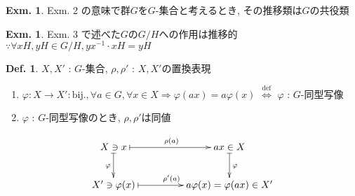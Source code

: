 \documentclass[uplatex,dvipdfmx,9pt]{beamer}
\newcommand{\defarrow}{\overset{\mathrm{def}}{\Leftrightarrow}}
\newcommand{\inverse}[1]{#1^{-1}}
\newcounter{textExmCount}
\theoremstyle{definition} %
\newtheorem{defn}{Def.}[subsection] %
\theoremstyle{example}
\newtheorem{exmText}[textExmCount]{Exm.}
\begin{document}
      \begin{frame}

        \begin{exmText}
          Exm. 2 の意味で群$G$を$G$-集合と考えるとき, その推移類は$G$の共役類
        \end{exmText}

        \begin{exmText}
          Exm. 3 で述べた$G$の$G/H$への作用は推移的 \\
          $\because \forall xH, yH \in G/H, y \inverse{x} \cdot xH = yH$
        \end{exmText}
        
      \end{frame}

      \begin{frame}

        \begin{defn}
          $X, X'$ : $G$-集合, $\rho, \rho'$ : $X, X'$の置換表現 \\
          \begin{enumerate}
            \item $\varphi \colon X \to X': \text{bij.}, \forall a \in G, \forall x \in X \Rightarrow \varphi(ax) = a\varphi(x)$ $\defarrow$ $\varphi$ : \alert{$G$-同型写像} 
            \item $\varphi$ : $G$-同型写像のとき, $\rho, \rho'$は\alert{同値}
          \end{enumerate}
        \end{defn}

        \[
          \xymatrix@!C{
            {X \ni x} \ar@{|->}[d]_{\varphi} \ar@{|->}[r]^{\rho(a)} & {ax \in X} \ar@{|->}[d]^{\varphi} \\
            {X' \ni \varphi(x)} \ar@{|->}[r]^{\rho'(a)} & {a\varphi(x) = \varphi(ax) \in X'}
          }
        \]
      \end{frame}
\end{document}
